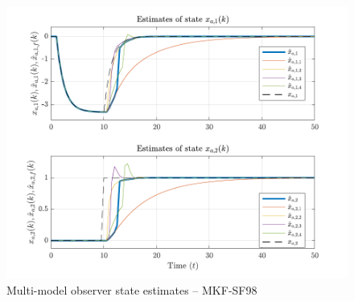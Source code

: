 \begin{figure}[htp]
	\centering
	\includegraphics[width=13cm]{images/rod_MKF_test_sim_MKF_SF98_x_est.pdf}
	\caption{Multi-model observer state estimates – MKF-SF98}
	\label{fig:rod-obs-sim-test-x_est-SF98}
\end{figure}

